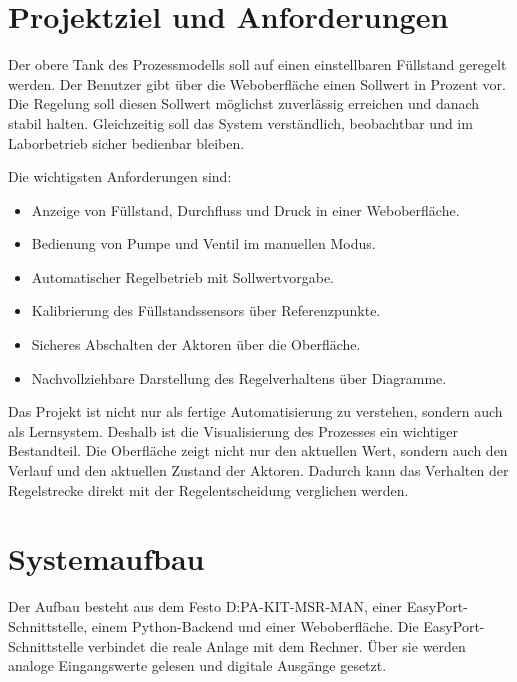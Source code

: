 \documentclass[12pt,a4paper]{scrartcl}
\begin{document}
\section{Projektziel und Anforderungen}

Der obere Tank des Prozessmodells soll auf einen einstellbaren Füllstand geregelt werden. Der Benutzer gibt über die Weboberfläche einen Sollwert in Prozent vor. Die Regelung soll diesen Sollwert möglichst zuverlässig erreichen und danach stabil halten. Gleichzeitig soll das System verständlich, beobachtbar und im Laborbetrieb sicher bedienbar bleiben.

Die wichtigsten Anforderungen sind:

\begin{itemize}
  \item Anzeige von Füllstand, Durchfluss und Druck in einer Weboberfläche.
  \item Bedienung von Pumpe und Ventil im manuellen Modus.
  \item Automatischer Regelbetrieb mit Sollwertvorgabe.
  \item Kalibrierung des Füllstandssensors über Referenzpunkte.
  \item Sicheres Abschalten der Aktoren über die Oberfläche.
  \item Nachvollziehbare Darstellung des Regelverhaltens über Diagramme.
\end{itemize}

Das Projekt ist nicht nur als fertige Automatisierung zu verstehen, sondern auch als Lernsystem. Deshalb ist die Visualisierung des Prozesses ein wichtiger Bestandteil. Die Oberfläche zeigt nicht nur den aktuellen Wert, sondern auch den Verlauf und den aktuellen Zustand der Aktoren. Dadurch kann das Verhalten der Regelstrecke direkt mit der Regelentscheidung verglichen werden.

\section{Systemaufbau}

Der Aufbau besteht aus dem Festo D:PA-KIT-MSR-MAN, einer EasyPort-Schnittstelle, einem Python-Backend und einer Weboberfläche. Die EasyPort-Schnittstelle verbindet die reale Anlage mit dem Rechner. Über sie werden analoge Eingangswerte gelesen und digitale Ausgänge gesetzt.
\end{document}
